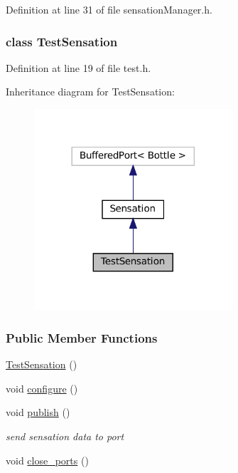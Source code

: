Definition at line 31 of file sensation\+Manager.\+h.

\label{classTestSensation}
\subsubsection{class Test\+Sensation}


Definition at line 19 of file test.\+h.



Inheritance diagram for Test\+Sensation\+:
\nopagebreak
\begin{figure}[H]
\begin{center}
\leavevmode
\includegraphics[width=209pt]{classTestSensation__inherit__graph}
\end{center}
\end{figure}
\subsubsection*{Public Member Functions}
\begin{DoxyCompactItemize}
\item 
\hyperlink{group__sensationManager_a8ae3442345d6ef38860588c9f04a4632}{Test\+Sensation} ()
\item 
void \hyperlink{group__sensationManager_aa09c7e493d895039e889bc7c3c92ee52}{configure} ()
\item 
void \hyperlink{group__sensationManager_ab97ecc34efb14126e76b70446a9d5866}{publish} ()
\begin{DoxyCompactList}\small\item\em send sensation data to port \end{DoxyCompactList}\item 
void \hyperlink{group__sensationManager_adfca7f97bb5a9c16c172f43462a7b762}{close\+\_\+ports} ()
\end{DoxyCompactItemize}


